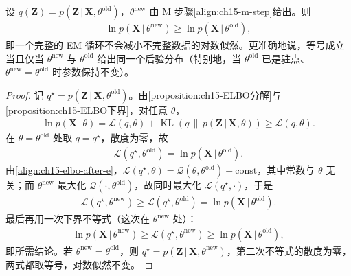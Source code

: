 \documentclass[../../main.tex]{subfiles}
\begin{document}
\begin{theorem}[EM 算法的单调性]\label{theorem:ch15-EM单调性}
设 $q(\bm{Z})=p(\bm{Z}\,|\,\bm{X},\theta^{\text{old}})$，$\theta^{\text{new}}$ 由 M 步骤\eqref{align:ch15-m-step}给出。则
\begin{align*}
\ln p(\bm{X}\,|\,\theta^{\text{new}})\geqslant\ln p(\bm{X}\,|\,\theta^{\text{old}}),
\end{align*}
即一个完整的 EM 循环不会减小不完整数据的对数似然。更准确地说，等号成立当且仅当 $\theta^{\text{new}}$ 与 $\theta^{\text{old}}$ 给出同一个后验分布（特别地，当 $\theta^{\text{old}}$ 已是驻点、$\theta^{\text{new}}=\theta^{\text{old}}$ 时参数保持不变）。
\end{theorem}
\begin{proof}
记 $q^\star=p(\bm{Z}\,|\,\bm{X},\theta^{\text{old}})$。由\cref{proposition:ch15-ELBO分解}与\cref{proposition:ch15-ELBO下界}，对任意 $\theta$，
\begin{align*}
\ln p(\bm{X}\,|\,\theta)=\mathcal{L}(q,\theta)+\operatorname{KL}\!\left(q\,\|\,p(\bm{Z}\,|\,\bm{X},\theta)\right)\geqslant\mathcal{L}(q,\theta).
\end{align*}
在 $\theta=\theta^{\text{old}}$ 处取 $q=q^\star$，散度为零，故
\begin{align*}
\mathcal{L}(q^\star,\theta^{\text{old}})=\ln p(\bm{X}\,|\,\theta^{\text{old}}).
\end{align*}
由\eqref{align:ch15-elbo-after-e}，$\mathcal{L}(q^\star,\theta)=\mathcal{Q}(\theta,\theta^{\text{old}})+\text{const}$，其中常数与 $\theta$ 无关；而 $\theta^{\text{new}}$ 最大化 $\mathcal{Q}(\cdot,\theta^{\text{old}})$，故同时最大化 $\mathcal{L}(q^\star,\cdot)$，于是
\begin{align*}
\mathcal{L}(q^\star,\theta^{\text{new}})\geqslant\mathcal{L}(q^\star,\theta^{\text{old}})=\ln p(\bm{X}\,|\,\theta^{\text{old}}).
\end{align*}
最后再用一次下界不等式（这次在 $\theta^{\text{new}}$ 处）：
\begin{align*}
\ln p(\bm{X}\,|\,\theta^{\text{new}})\geqslant\mathcal{L}(q^\star,\theta^{\text{new}})\geqslant\ln p(\bm{X}\,|\,\theta^{\text{old}}),
\end{align*}
即所需结论。若 $\theta^{\text{new}}=\theta^{\text{old}}$，则 $q^\star=p(\bm{Z}\,|\,\bm{X},\theta^{\text{new}})$，第二次不等式的散度为零，两式都取等号，对数似然不变。
\end{proof}
\end{document}
